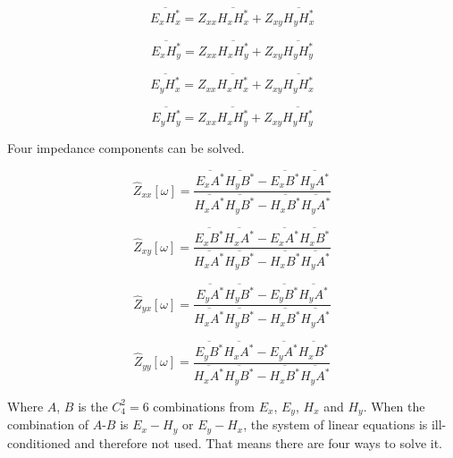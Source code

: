 \documentclass[9pt,a4paper,twoside]{rho-class/rho}
\begin{document}
\begin{equation}
    \label{apow1}
    \overline{E_xH_x^\ast}=Z_{xx}\overline{H_xH_x^\ast}+Z_{xy}\overline{H_yH_x^\ast} 
\end{equation}

\begin{equation}
    \label{apow2}
    \overline{E_xH_y^\ast}=Z_{xx}\overline{H_xH_y^\ast}+Z_{xy}\overline{H_yH_y^\ast} 
\end{equation}

\begin{equation}
    \label{apow3}
    \overline{E_yH_x^\ast}=Z_{xx}\overline{H_xH_x^\ast}+Z_{xy}\overline{H_yH_x^\ast} 
\end{equation}

\begin{equation}
    \label{apow4}
    \overline{E_yH_y^\ast}=Z_{xx}\overline{H_xH_y^\ast}+Z_{xy}\overline{H_yH_y^\ast} 
\end{equation}

Four impedance components can be solved.

\begin{equation}
    \label{zxx}
    \hat{Z}_{xx}[\omega]=\dfrac{\overline{E_xA^\ast}\overline{H_yB^\ast}-\overline{E_xB^\ast}\overline{H_yA^\ast}}{\overline{H_xA^\ast}\overline{H_yB^\ast}-\overline{H_xB^\ast}\overline{H_yA^\ast}}
\end{equation}

\begin{equation}
    \label{zxy}
    \hat{Z}_{xy}[\omega]=\dfrac{\overline{E_xB^\ast}\overline{H_xA^\ast}-\overline{E_xA^\ast}\overline{H_xB^\ast}}{\overline{H_xA^\ast}\overline{H_yB^\ast}-\overline{H_xB^\ast}\overline{H_yA^\ast}}
\end{equation}

\begin{equation}
    \label{zyx}
    \hat{Z}_{yx}[\omega]=\dfrac{\overline{E_yA^\ast}\overline{H_yB^\ast}-\overline{E_yB^\ast}\overline{H_yA^\ast}}{\overline{H_xA^\ast}\overline{H_yB^\ast}-\overline{H_xB^\ast}\overline{H_yA^\ast}}
\end{equation}

\begin{equation}
    \label{zyy}
    \hat{Z}_{yy}[\omega]=\dfrac{\overline{E_yB^\ast}\overline{H_xA^\ast}-\overline{E_yA^\ast}\overline{H_xB^\ast}}{\overline{H_xA^\ast}\overline{H_yB^\ast}-\overline{H_xB^\ast}\overline{H_yA^\ast}}
\end{equation}

Where $A$, $B$ is the $C_4^2=6$ combinations from $E_x$, $E_y$, $H_x$ and $H_y$. When the combination of $A$-$B$ is $E_x-H_y$ or $E_y-H_x$, the system of linear equations is ill-conditioned and therefore not used. That means there are four ways to solve it.
\end{document}
